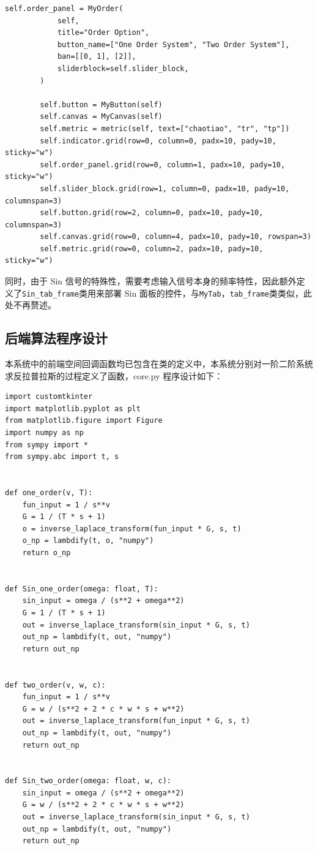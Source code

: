 \documentclass[12pt]{ctexart}
\begin{document}
\begin{lstlisting}[title=TabView 与 tab_frame 类代码]
        self.order_panel = MyOrder(
            self,
            title="Order Option",
            button_name=["One Order System", "Two Order System"],
            ban=[[0, 1], [2]],
            sliderblock=self.slider_block,
        )

        self.button = MyButton(self)
        self.canvas = MyCanvas(self)
        self.metric = metric(self, text=["chaotiao", "tr", "tp"])
        self.indicator.grid(row=0, column=0, padx=10, pady=10, sticky="w")
        self.order_panel.grid(row=0, column=1, padx=10, pady=10, sticky="w")
        self.slider_block.grid(row=1, column=0, padx=10, pady=10, columnspan=3)
        self.button.grid(row=2, column=0, padx=10, pady=10, columnspan=3)
        self.canvas.grid(row=0, column=4, padx=10, pady=10, rowspan=3)
        self.metric.grid(row=0, column=2, padx=10, pady=10, sticky="w")
\end{lstlisting}

同时，由于 Sin 信号的特殊性，需要考虑输入信号本身的频率特性，因此额外定义了\texttt{Sin_tab_frame}类用来部署 Sin 面板的控件，与\texttt{MyTab}，\texttt{tab_frame}类类似，此处不再赘述。

\subsection{后端算法程序设计}

本系统中的前端空间回调函数均已包含在类的定义中，本系统分别对一阶二阶系统求反拉普拉斯的过程定义了函数，core.py 程序设计如下：

\begin{lstlisting}[title=core.py--inverse_laplace_transform]
import customtkinter
import matplotlib.pyplot as plt
from matplotlib.figure import Figure
import numpy as np
from sympy import *
from sympy.abc import t, s


def one_order(v, T):
    fun_input = 1 / s**v
    G = 1 / (T * s + 1)
    o = inverse_laplace_transform(fun_input * G, s, t)
    o_np = lambdify(t, o, "numpy")
    return o_np


def Sin_one_order(omega: float, T):
    sin_input = omega / (s**2 + omega**2)
    G = 1 / (T * s + 1)
    out = inverse_laplace_transform(sin_input * G, s, t)
    out_np = lambdify(t, out, "numpy")
    return out_np


def two_order(v, w, c):
    fun_input = 1 / s**v
    G = w / (s**2 + 2 * c * w * s + w**2)
    out = inverse_laplace_transform(fun_input * G, s, t)
    out_np = lambdify(t, out, "numpy")
    return out_np


def Sin_two_order(omega: float, w, c):
    sin_input = omega / (s**2 + omega**2)
    G = w / (s**2 + 2 * c * w * s + w**2)
    out = inverse_laplace_transform(sin_input * G, s, t)
    out_np = lambdify(t, out, "numpy")
    return out_np
\end{lstlisting}
\end{document}
